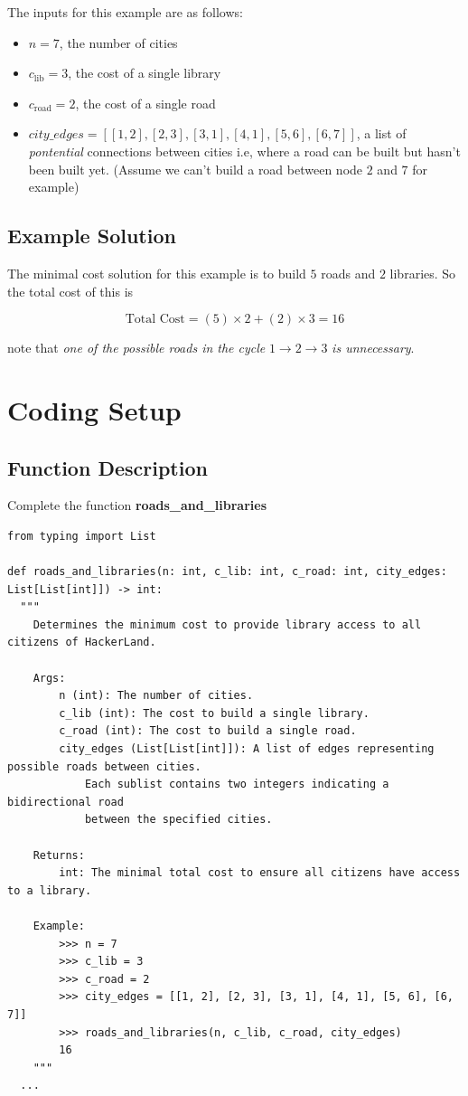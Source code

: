 \documentclass[11pt, a4paper, oneside]{article}
\begin{document}
The inputs for this example are as follows:

\begin{itemize}
  \item \(n = 7\), the number of cities
  \item \(c_{\text{lib}} = 3\), the cost of a single library
  \item \(c_{\text{road}} = 2\), the cost of a single road
  \item \(city\_edges = [[1, 2], [2, 3], [3, 1], [4, 1], [5, 6], [6, 7]]\), a list of \textit{pontential} connections between cities i.e, where a road can be built but hasn't been built yet. (Assume we can't build a road between node \(2\) and \(7\) for example)
\end{itemize}

\subsection*{Example Solution}

The minimal cost solution for this example is to build \(5\) roads and \(2\) libraries. So the total cost of this is

\[\text{Total Cost} = (5) \times 2 + (2) \times 3 = 16\]

note that\textit{ one of the possible roads in the cycle} \(1 \rightarrow 2 \rightarrow 3\) \textit{is unnecessary}.

\section*{Coding Setup}

\subsection*{Function Description}

Complete the function \textbf{roads\_and\_libraries}

\begin{verbatim}
from typing import List

def roads_and_libraries(n: int, c_lib: int, c_road: int, city_edges: List[List[int]]) -> int:
  """
    Determines the minimum cost to provide library access to all citizens of HackerLand.

    Args:
        n (int): The number of cities.
        c_lib (int): The cost to build a single library.
        c_road (int): The cost to build a single road.
        city_edges (List[List[int]]): A list of edges representing possible roads between cities.
            Each sublist contains two integers indicating a bidirectional road
            between the specified cities.

    Returns:
        int: The minimal total cost to ensure all citizens have access to a library.

    Example:
        >>> n = 7
        >>> c_lib = 3
        >>> c_road = 2
        >>> city_edges = [[1, 2], [2, 3], [3, 1], [4, 1], [5, 6], [6, 7]]
        >>> roads_and_libraries(n, c_lib, c_road, city_edges)
        16
    """
  ...
\end{verbatim}
\end{document}
